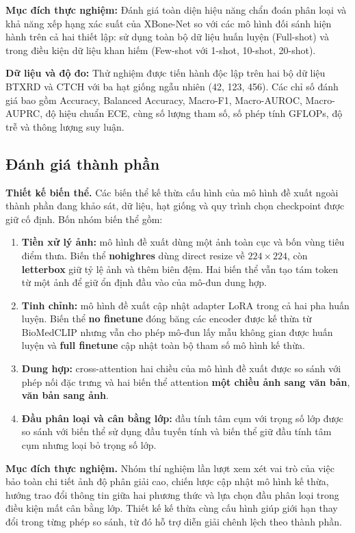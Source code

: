 \textbf{Mục đích thực nghiệm:} Đánh giá toàn diện hiệu năng chẩn đoán phân loại và khả năng xếp hạng xác suất của XBone-Net so với các mô hình đối sánh hiện hành trên cả hai thiết lập: sử dụng toàn bộ dữ liệu huấn luyện (Full-shot) và trong điều kiện dữ liệu khan hiếm (Few-shot với 1-shot, 10-shot, 20-shot).

\textbf{Dữ liệu và độ đo:} Thử nghiệm được tiến hành độc lập trên hai bộ dữ liệu BTXRD và CTCH với ba hạt giống ngẫu nhiên (42, 123, 456). Các chỉ số đánh giá bao gồm Accuracy, Balanced Accuracy, Macro-F1, Macro-AUROC, Macro-AUPRC, độ hiệu chuẩn ECE, cùng số lượng tham số, số phép tính GFLOPs, độ trễ và thông lượng suy luận.

\subsection{Đánh giá thành phần}
\label{subsec:component_evaluation}

\textbf{Thiết kế biến thể.} Các biến thể kế thừa cấu hình của mô hình đề xuất ngoài thành phần đang khảo sát, dữ liệu, hạt giống và quy trình chọn checkpoint được giữ cố định. Bốn nhóm biến thể gồm:
\begin{enumerate}
    \item \textbf{Tiền xử lý ảnh:} mô hình đề xuất dùng một ảnh toàn cục và
    bốn vùng tiêu điểm thưa. Biến thể \textbf{nohighres} dùng direct resize về $224\times224$, còn \textbf{letterbox} giữ tỷ lệ ảnh và thêm biên đệm. Hai biến thể vẫn tạo tám token từ một ảnh để giữ ổn định đầu vào của mô-đun dung hợp.
    \item \textbf{Tinh chỉnh:} mô hình đề xuất cập nhật adapter
    LoRA trong cả hai pha huấn luyện. Biến thể \textbf{no finetune} đóng băng các encoder được kế thừa từ BioMedCLIP \cite{BiomedCLIP} nhưng vẫn cho phép mô-đun lấy mẫu không gian được huấn luyện và \textbf{full finetune} cập nhật toàn bộ tham số mô hình kế thừa.
    \item \textbf{Dung hợp:} cross-attention hai chiều của mô hình đề xuất
    được so sánh với phép nối đặc trưng và hai biến thể attention
    \textbf{một chiều ảnh sang văn bản}, \textbf{văn bản sang ảnh}.
    \item \textbf{Đầu phân loại và cân bằng lớp:} đầu tính tâm cụm với
    trọng số lớp được so sánh với biến thể sử dụng đầu tuyến tính và biến thể giữ đầu tính tâm cụm nhưng loại bỏ trọng số lớp.
\end{enumerate}

\textbf{Mục đích thực nghiệm.} Nhóm thí nghiệm lần lượt xem xét vai trò của việc bảo toàn chi tiết ảnh độ phân giải cao, chiến lược cập nhật mô hình kế thừa, hướng trao đổi thông tin giữa hai phương thức và lựa chọn đầu phân loại trong điều kiện mất cân bằng lớp. Thiết kế kế thừa cùng cấu hình giúp giới hạn thay đổi trong từng phép so sánh, từ đó hỗ trợ diễn giải chênh lệch theo thành phần.

